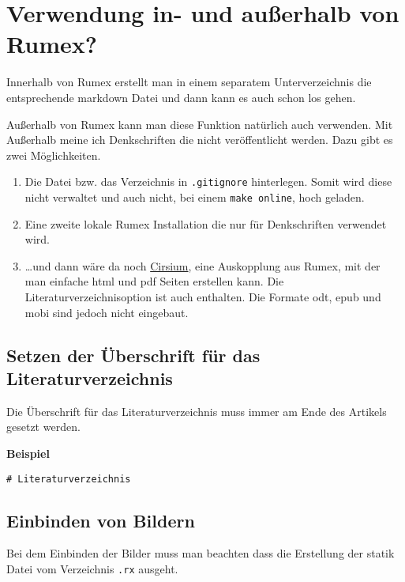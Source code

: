 \section{Verwendung in- und außerhalb von
Rumex?}\label{verwendung-in--und-auuxdferhalb-von-rumex}

Innerhalb von Rumex erstellt man in einem separatem Unterverzeichnis die
entsprechende markdown Datei und dann kann es auch schon los gehen.

Außerhalb von Rumex kann man diese Funktion natürlich auch verwenden.
Mit Außerhalb meine ich Denkschriften die nicht veröffentlicht werden.
Dazu gibt es zwei Möglichkeiten.

\begin{enumerate}
\def\labelenumi{\arabic{enumi}.}
\item
  Die Datei bzw. das Verzeichnis in \texttt{.gitignore} hinterlegen.
  Somit wird diese nicht verwaltet und auch nicht, bei einem
  \texttt{make online}, hoch geladen.
\item
  Eine zweite lokale Rumex Installation die nur für Denkschriften
  verwendet wird.
\item
  \ldots{}und dann wäre da noch
  \href{https://github.com/itbayer/cirsium}{Cirsium}, eine Auskopplung
  aus Rumex, mit der man einfache html und pdf Seiten erstellen kann.
  Die Literaturverzeichnisoption ist auch enthalten. Die Formate odt,
  epub und mobi sind jedoch nicht eingebaut.
\end{enumerate}

\subsection{Setzen der Überschrift für das
Literaturverzeichnis}\label{setzen-der-uxfcberschrift-fuxfcr-das-literaturverzeichnis}

Die Überschrift für das Literaturverzeichnis muss immer am Ende des
Artikels gesetzt werden.

\textbf{Beispiel}

\begin{verbatim}
# Literaturverzeichnis
\end{verbatim}

\subsection{Einbinden von Bildern}\label{einbinden-von-bildern}

Bei dem Einbinden der Bilder muss man beachten dass die Erstellung der
statik Datei vom Verzeichnis \texttt{.rx} ausgeht.


